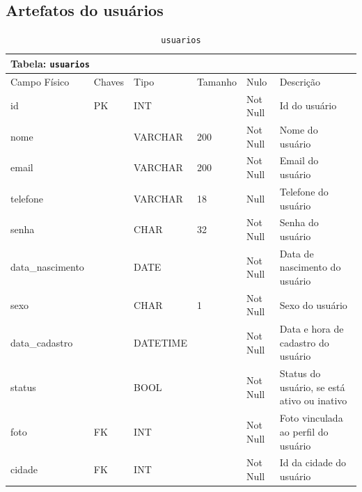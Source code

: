 \documentclass[12pt,a4paper]{article}
\begin{document}
\subsection{Artefatos do usuários}


\begin{center}
\begin{table}[h!]
	\caption{\texttt{usuarios}}
	\label{tabela:usuarios}
	\begin{tabular}{|p{2.3cm}|p{1.2cm}|p{1.8cm}|p{1.5cm}|p{1cm}|p{6cm}|}\hline	
		\multicolumn{6}{|p{16cm}|}{\cellcolor{cinzaClaro}  \centering Tabela: \texttt{usuarios}} \\ \hline %
		{\small Campo Físico}   & {\small Chaves} & {\small Tipo} & {\small Tamanho} & {\small Nulo} & {\small Descrição}\\\hline %
		
		{\tiny id} & {\tiny PK} & {\tiny INT} & {\tiny } & {\tiny Not Null} &{\tiny Id do usuário}\\\hline
		{\tiny nome} & {\tiny } & {\tiny VARCHAR} & {\tiny 200} & {\tiny Not Null} &{\tiny  Nome do usuário}\\\hline
		{\tiny email} & {\tiny } & {\tiny VARCHAR} & {\tiny 200} & {\tiny Not Null} &{\tiny Email do usuário}\\\hline
		{\tiny telefone} & {\tiny } & {\tiny VARCHAR } & {\tiny 18} & {\tiny  Null} &{\tiny Telefone do usuário}\\\hline
		{\tiny senha} & {\tiny } & {\tiny CHAR} & {\tiny 32} & {\tiny Not Null} &{\tiny Senha do usuário}\\\hline
		{\tiny data\_nascimento} & {\tiny } & {\tiny DATE} & {\tiny } & {\tiny Not Null} &{\tiny Data de nascimento do usuário}\\\hline
		{\tiny sexo} & {\tiny } & {\tiny CHAR} & {\tiny 1} & {\tiny Not Null} &{\tiny Sexo do usuário}\\\hline
		{\tiny data\_cadastro} & {\tiny } & {\tiny DATETIME} & {\tiny } & {\tiny Not Null} &{\tiny Data e hora de cadastro do usuário}\\\hline
		{\tiny status} & {\tiny } & {\tiny BOOL} & {\tiny } & {\tiny Not Null} &{\tiny Status do usuário, se está ativo ou inativo}\\\hline		
		{\tiny foto} & {\tiny FK} & {\tiny INT} & {\tiny } & {\tiny Not Null} &{\tiny Foto vinculada ao perfil do usuário}\\\hline
		{\tiny cidade} & {\tiny FK} & {\tiny INT} & {\tiny } & {\tiny Not Null} &{\tiny Id da cidade do usuário}\\\hline
		
			
	\end{tabular}
\end{table}	
\end{center}
\end{document}
